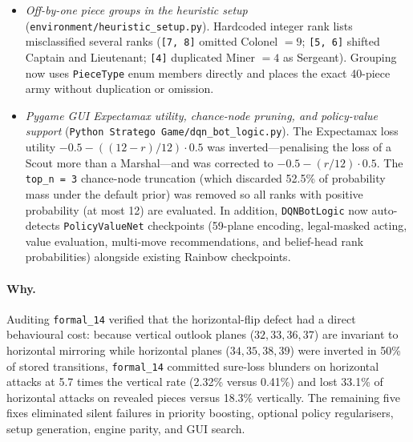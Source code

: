 \begin{itemize}
        nine-square ray, the original outlook code read square $(0, 0)$ instead of sentinel index
        100 (the three-position discrepancy noted in Section~\ref{sec:vec-engine}). Guarding empty
        rays with \texttt{torch.where} brings it into exact agreement with \texttt{vec/engine.py},
        and the cross-engine parity test now requires zero tolerated plane differences across all
        59 planes.
  \item \emph{Off-by-one piece groups in the heuristic setup}
        (\texttt{environment/heuristic\_setup.py}). Hardcoded integer rank lists misclassified
        several ranks (\texttt{[7, 8]} omitted Colonel $= 9$; \texttt{[5, 6]} shifted Captain and
        Lieutenant; \texttt{[4]} duplicated Miner $= 4$ as Sergeant). Grouping now uses
        \texttt{PieceType} enum members directly and places the exact 40-piece army without
        duplication or omission.
  \item \emph{Pygame GUI Expectamax utility, chance-node pruning, and policy-value support}
        (\texttt{Python Stratego Game/dqn\_bot\_logic.py}). The Expectamax loss utility
        $-0.5 - ((12 - r)/12) \cdot 0.5$ was inverted---penalising the loss of a Scout more than a
        Marshal---and was corrected to $-0.5 - (r/12) \cdot 0.5$. The \texttt{top\_n = 3}
        chance-node truncation (which discarded 52.5\% of probability mass under the default prior)
        was removed so all ranks with positive probability (at most 12) are evaluated. In
        addition, \texttt{DQNBotLogic} now auto-detects \texttt{PolicyValueNet} checkpoints
        (59-plane encoding, legal-masked acting, value evaluation, multi-move recommendations, and
        belief-head rank probabilities) alongside existing Rainbow checkpoints.
\end{itemize}

\paragraph{Why.} Auditing \texttt{formal\_14} verified that the horizontal-flip defect had a direct
behavioural cost: because vertical outlook planes ($32, 33, 36, 37$) are invariant to horizontal
mirroring while horizontal planes ($34, 35, 38, 39$) were inverted in 50\% of stored transitions,
\texttt{formal\_14} committed sure-loss blunders on horizontal attacks at 5.7 times the vertical
rate (2.32\% versus 0.41\%) and lost 33.1\% of horizontal attacks on revealed pieces versus 18.3\%
vertically. The remaining five fixes eliminated silent failures in priority boosting, optional
policy regularisers, setup generation, engine parity, and GUI search.

